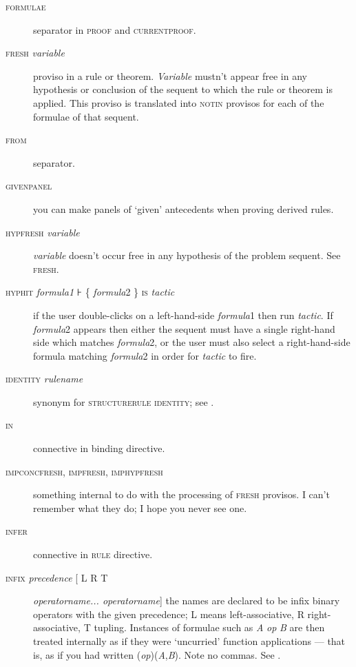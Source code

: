 \begin{description}
\item[\textsc{formulae}] separator in \textsc{proof} and \textsc{currentproof}.

\item[\textsc{fresh} \textit{variable}] proviso in a rule or theorem. \textit{Variable} mustn't appear free in any hypothesis or conclusion of the sequent to which the rule or theorem is applied. This proviso is translated into \textsc{notin} provisos for each of the formulae of that sequent.

\item[\textsc{from}] separator.

\item[\textsc{givenpanel}] you can make panels of `given' antecedents when proving derived rules.

\item[\textsc{hypfresh} \textit{variable}] \textit{variable} doesn't occur free in any hypothesis of the problem sequent. See \textsc{fresh.}

\item[\textsc{hyphit} \textit{formula1} ⊦ \{ \textit{formula}2 \} \textsc{is} \textit{tactic}] if the user double-clicks on a left-hand-side \textit{formula}1 then run \textit{tactic}. If \textit{formula}2 appears then either the sequent must have a single right-hand side which matches \textit{formula}2, or the user must also select a right-hand-side formula matching \textit{formula}2 in order for \textit{tactic} to fire.

\item[\textsc{identity} \textit{rulename}] synonym for \textsc{structurerule} \textsc{identity}; see .

\item[\textsc{in}] connective in binding directive.

\item[\textsc{impconcfresh}, \textsc{impfresh}, \textsc{imphypfresh}] something internal to do with the processing of \textsc{fresh} provisos. I can't remember what they do; I hope you never see one.

\item[\textsc{infer}] connective in \textsc{rule} directive.

\item[\textsc{infix} \textit{precedence} [ L {\textbar} R {\textbar} T ] \textit{operatorname... operatorname}] the names are declared to be infix binary operators with the given precedence; L means left-associative, R right-associative, T tupling. Instances of formulae such as \textit{A} \textit{op} \textit{B} are then treated internally as if they were `uncurried' function applications --- that is, as if you had written (\textit{op})(\textit{A},\textit{B}). Note no commas. See .


\end{description}
